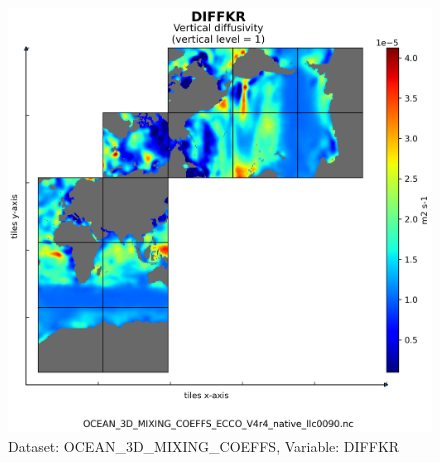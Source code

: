 \begin{figure}[H]
\centering
\includegraphics[scale=0.55]{../images/plots/native_plots/Ocean_3D_Gent-Mcwilliams_Redi_and_Background_Vertical_Diffusivity_Coefficients_for_the_Lat-Lon-Cap_90_(llc90)_Native_Model_Grid_(Version_4_Release_4)/DIFFKR.png}
\caption{Dataset: OCEAN\_3D\_MIXING\_COEFFS, Variable: DIFFKR}
\label{tab:table-OCEAN_3D_MIXING_COEFFS_DIFFKR-Plot}
\end{figure}
\newpage
\pagebreak
